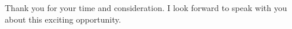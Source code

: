 \documentclass[11pt, a4paper]{ishan-cv} %
\begin{document}
\begin{cvletter}
Thank you for your time and consideration. I look forward to speak with you about this exciting opportunity.

\end{cvletter}


\makeletterclosing %
\end{document}
